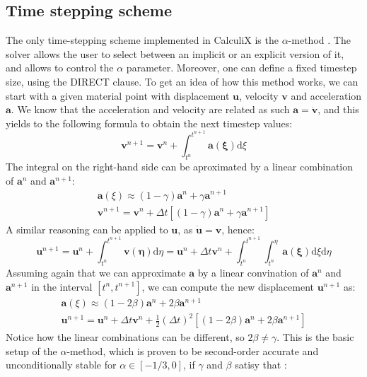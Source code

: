 \documentclass[
  english,        %
  font=times,     %
  onecolumn,      %
]{tumarticle}
\begin{document}
\subsection{Time stepping scheme}
The only time-stepping scheme implemented in CalculiX is the $\alpha$-method \cite{dhondt2017calculix}. The solver allows the user to select between an implicit or an explicit version of it, and allows to control the $\alpha$ parameter. Moreover, one can define a fixed timestep size, using the DIRECT clause. To get an idea of how this method works, we can start with a given material point with displacement $\boldsymbol{u}$, velocity $\boldsymbol{v}$ and acceleration $\boldsymbol{a}$. We know that the acceleration and velocity are related as such $\boldsymbol{a} = \dot{\boldsymbol{v}}$, and this yields to the following formula to obtain the next timestep values:
\begin{equation}
    \boldsymbol{v}^{n+1} = \boldsymbol{v}^n + \int_{t^n}^{t^{n+1}} \boldsymbol{a(\xi)} \text{d}\xi
\end{equation}
The integral on the right-hand side can be aproximated by a linear combination of $ \boldsymbol{a}^n$ and $\boldsymbol{a}^{n+1}$:
\begin{gather}
    \boldsymbol{a}(\xi) \approx  (1 - \gamma) \boldsymbol{a}^n + \gamma \boldsymbol{a}^{n+1}\\
    \boldsymbol{v}^{n+1} = \boldsymbol{v}^n + \Delta t \left[ (1 - \gamma) \boldsymbol{a}^n + \gamma \boldsymbol{a}^{n+1} \right]
\end{gather} 
A similar reasoning can be applied to $\boldsymbol{u}$, as $\boldsymbol{\dot{u}} = \boldsymbol{v}$, hence:
\begin{equation}
    \boldsymbol{u}^{n+1} 
    = \boldsymbol{u}^n + \int_{t^n}^{t^{n+1}} \boldsymbol{v(\eta)}  \text{d}\eta 
    = \boldsymbol{u}^n + \Delta t \boldsymbol{v}^n + \int_{t^n}^{t^{n+1}} \int_{t^n}^{\eta} \boldsymbol{a(\xi)} \text{d}\xi \text{d}\eta 
\end{equation}
Assuming again that we can approximate $\boldsymbol{a}$ by a linear convination of $ \boldsymbol{a}^n$ and $\boldsymbol{a}^{n+1}$ in the interval $\left[ t^n, t^{n+1} \right]$, we can compute the new displacement $\boldsymbol{u}^{n+1}$ as:
\begin{gather}
    \boldsymbol{a}(\xi) \approx  (1 - 2\beta) \boldsymbol{a}^n + 2\beta \boldsymbol{a}^{n+1}\\
    \boldsymbol{u}^{n+1} = \boldsymbol{u}^n + \Delta t \boldsymbol{v}^n
    + \frac{1}{2} (\Delta t)^2 \left[ (1 - 2\beta) \boldsymbol{a}^n + 2\beta \boldsymbol{a}^{n+1} \right]
\end{gather} 
Notice how the linear combinations can be different, so $2\beta \neq \gamma$. This is the basic setup of the $\alpha$-method, which is proven to be second-order accurate and unconditionally stable for $\alpha \in [-1/3, 0]$, if $\gamma$ and $\beta$ satisy that \cite{dhondt2004finite}:
\end{document}

